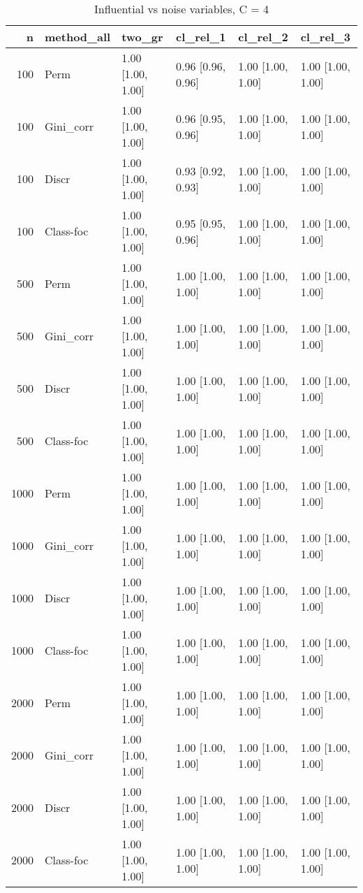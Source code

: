 \begin{table}[ht]
\centering
\caption{Influential vs noise variables, C = 4} 
\begin{tabular}{rlllll}
  \hline
n & method\_all & two\_gr & cl\_rel\_1 & cl\_rel\_2 & cl\_rel\_3 \\ 
  \hline
100 & Perm & 1.00 [1.00, 1.00] & 0.96 [0.96, 0.96] & 1.00 [1.00, 1.00] & 1.00 [1.00, 1.00] \\ 
  100 & Gini\_corr & 1.00 [1.00, 1.00] & 0.96 [0.95, 0.96] & 1.00 [1.00, 1.00] & 1.00 [1.00, 1.00] \\ 
  100 & Discr & 1.00 [1.00, 1.00] & 0.93 [0.92, 0.93] & 1.00 [1.00, 1.00] & 1.00 [1.00, 1.00] \\ 
  100 & Class-foc & 1.00 [1.00, 1.00] & 0.95 [0.95, 0.96] & 1.00 [1.00, 1.00] & 1.00 [1.00, 1.00] \\ 
   \hline 500 & Perm & 1.00 [1.00, 1.00] & 1.00 [1.00, 1.00] & 1.00 [1.00, 1.00] & 1.00 [1.00, 1.00] \\ 
  500 & Gini\_corr & 1.00 [1.00, 1.00] & 1.00 [1.00, 1.00] & 1.00 [1.00, 1.00] & 1.00 [1.00, 1.00] \\ 
  500 & Discr & 1.00 [1.00, 1.00] & 1.00 [1.00, 1.00] & 1.00 [1.00, 1.00] & 1.00 [1.00, 1.00] \\ 
  500 & Class-foc & 1.00 [1.00, 1.00] & 1.00 [1.00, 1.00] & 1.00 [1.00, 1.00] & 1.00 [1.00, 1.00] \\ 
   \hline 1000 & Perm & 1.00 [1.00, 1.00] & 1.00 [1.00, 1.00] & 1.00 [1.00, 1.00] & 1.00 [1.00, 1.00] \\ 
  1000 & Gini\_corr & 1.00 [1.00, 1.00] & 1.00 [1.00, 1.00] & 1.00 [1.00, 1.00] & 1.00 [1.00, 1.00] \\ 
  1000 & Discr & 1.00 [1.00, 1.00] & 1.00 [1.00, 1.00] & 1.00 [1.00, 1.00] & 1.00 [1.00, 1.00] \\ 
  1000 & Class-foc & 1.00 [1.00, 1.00] & 1.00 [1.00, 1.00] & 1.00 [1.00, 1.00] & 1.00 [1.00, 1.00] \\ 
   \hline 2000 & Perm & 1.00 [1.00, 1.00] & 1.00 [1.00, 1.00] & 1.00 [1.00, 1.00] & 1.00 [1.00, 1.00] \\ 
  2000 & Gini\_corr & 1.00 [1.00, 1.00] & 1.00 [1.00, 1.00] & 1.00 [1.00, 1.00] & 1.00 [1.00, 1.00] \\ 
  2000 & Discr & 1.00 [1.00, 1.00] & 1.00 [1.00, 1.00] & 1.00 [1.00, 1.00] & 1.00 [1.00, 1.00] \\ 
  2000 & Class-foc & 1.00 [1.00, 1.00] & 1.00 [1.00, 1.00] & 1.00 [1.00, 1.00] & 1.00 [1.00, 1.00] \\ 
   \hline
\end{tabular}
\end{table}
